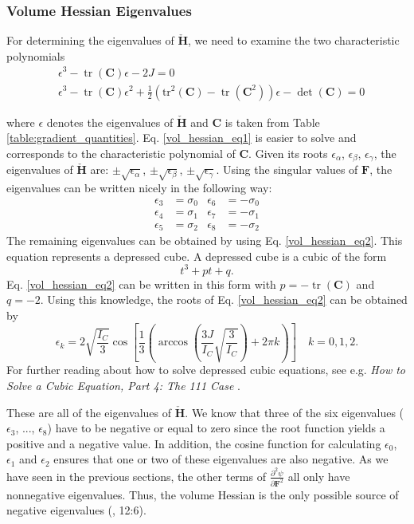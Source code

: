 \subsubsection{Volume Hessian Eigenvalues}
For determining the eigenvalues of $\mathbf{\check{H}}$, we need to examine the two characteristic polynomials
\begin{align}
&\epsilon^3 - \operatorname{tr}(\mathbf{C}) \epsilon - 2 J = 0  \label{vol_hessian_eq1} \\
&\epsilon^3 - \operatorname{tr}(\mathbf{C}) \epsilon^2 + \frac{1}{2} \left( \operatorname{tr^2}(\mathbf{C}) - \operatorname{tr}(\mathbf{C}^2) \right) \epsilon - \operatorname{det}(\mathbf{C}) = 0 \label{vol_hessian_eq2}
\end{align}

where $\epsilon$ denotes the eigenvalues of $\mathbf{\check{H}}$ and $\mathbf{C}$ is taken from Table \ref{table:gradient_quantities}. Eq. \ref{vol_hessian_eq1} is easier to solve and corresponds to the characteristic polynomial of $\mathbf{C}$. Given its roots $\epsilon_\alpha$, $\epsilon_\beta$, $\epsilon_\gamma$, the eigenvalues of $\mathbf{\check{H}}$ are: $\pm \sqrt{\epsilon_\alpha}$, $\pm \sqrt{\epsilon_\beta}$, $\pm \sqrt{\epsilon_\gamma}$. Using the singular values of $\mathbf{F}$, the eigenvalues can be written nicely in the following way:
\begin{align*}
\epsilon_3 &= \sigma_0 & \epsilon_6 &= -\sigma_0 \\
\epsilon_4 &= \sigma_1 & \epsilon_7 &= -\sigma_1 \\
\epsilon_5 &= \sigma_2 & \epsilon_8 &= -\sigma_2
\end{align*}
The remaining eigenvalues can be obtained by using Eq. \ref{vol_hessian_eq2}. This equation represents a depressed cube. A depressed cube is a cubic of the form
\[
t^3 + pt + q. 
\]
Eq. \ref{vol_hessian_eq2} can be written in this form with $p=-\operatorname{tr}(\mathbf{C})$ and $q= -2$. Using this knowledge, the roots of Eq. \ref{vol_hessian_eq2} can be obtained by
\[
\epsilon_k = 2 \sqrt{\frac{I_C}{3}} \operatorname{cos}\left[ \frac{1}{3} \left( \operatorname{arccos}\left(\frac{3 J}{I_C} \sqrt{\frac{3}{I_C}} \right) + 2 \pi k \right) \right] \quad  k= 0,1,2.
\]
For further reading about how to solve depressed cubic equations, see e.g. \textit{How to Solve a Cubic Equation, Part 4: The 111 Case} \cite{4052506}.

These are all of the eigenvalues of $\mathbf{\check{H}}$. We know that three of the six eigenvalues ($\epsilon_3$, ..., $\epsilon_8$) have to be negative or equal to zero since the root function yields a positive and a negative value. In addition, the cosine function for calculating $\epsilon_0$, $\epsilon_1$ and $\epsilon_2$ ensures that one or two of these eigenvalues are also negative. As we have seen in the previous sections, the other terms of $\frac{\partial^2 \psi}{\partial \mathbf{F}^2}$ all only have nonnegative eigenvalues. Thus, the volume Hessian is the only possible source of negative eigenvalues (\cite{Smith:2018:SNF:3191713.3180491}, 12:6).

